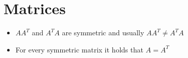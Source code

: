 \setcounter{section}{0} %

\section{Matrices}
	
\begin{itemize}
	\item $AA^T$ and $A^TA$ are symmetric and usually $AA^T \neq A^TA$
	\item For every symmetric matrix it holds that $A=A^T$
\end{itemize}	
	